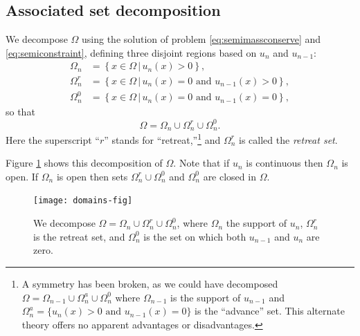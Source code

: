 \documentclass[final,leqno,onefignum,onetabnum]{siamltex1213bueler}
\begin{document}
\subsection{Associated set decomposition}  \label{subsec:setdecompose}  We decompose $\Omega$ using the solution of problem \eqref{eq:semimassconserve} and \eqref{eq:semiconstraint}, defining three disjoint regions based on $u_n$ and $u_{n-1}$:
\begin{align*}
\Omega_n &= \left\{x \in \Omega \,\big|\, u_n(x)>0\right\}, \\
\Omega_n^r &= \left\{x \in \Omega \,\big|\, u_n(x)=0 \text{ and } u_{n-1}(x) > 0\right\}, \\
\Omega_n^0 &= \left\{x \in \Omega \,\big|\, u_n(x)=0 \text{ and } u_{n-1}(x) = 0\right\},
\end{align*}
so that
\begin{equation}
\Omega = \Omega_n \cup \Omega_n^r \cup \Omega_n^0.  \label{eq:omegadecomposition}
\end{equation}
Here the superscript ``$r$'' stands for ``retreat,''\footnote{A symmetry has been broken, as we could have decomposed $\Omega= \Omega_{n-1} \cup \Omega_n^a \cup \Omega_n^0$ where $\Omega_{n-1}$ is the support of $u_{n-1}$ and $\Omega_n^a = \{u_n(x) > 0 \text{ and } u_{n-1}(x) = 0\}$ is the ``advance'' set.  This alternate theory offers no apparent advantages or disadvantages.} and $\Omega_n^r$ is called the \emph{retreat set}.

Figure \ref{fig:domains} shows this decomposition of $\Omega$.  Note that if $u_n$ is continuous then $\Omega_n$ is open.  If $\Omega_n$ is open then sets $\Omega_n^r \cup \Omega_n^0$ and $\Omega_n^0$ are closed in $\Omega$.

\begin{figure}[ht]
\begin{center}
\texttt{[image: domains-fig]}
\end{center}
\caption{We decompose $\Omega = \Omega_n \cup \Omega_n^r \cup \Omega_n^0$, where $\Omega_n$ the support of $u_n$, $\Omega_n^r$ is the retreat set, and $\Omega_n^0$ is the set on which both $u_{n-1}$ and $u_n$ are zero.}
\label{fig:domains}
\end{figure}
\end{document}
